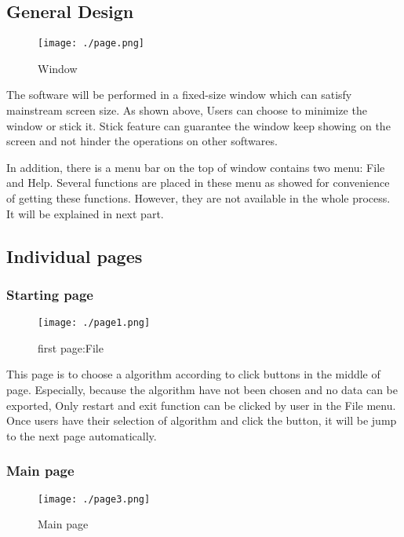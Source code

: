 \documentclass[11pt,oneside,a4paper]{article}
\begin{document}
    \subsection{General Design}
    \begin{figure}[ht]
        \centering
        \texttt{[image: ./page.png]}
        \caption{Window}
        \label{fig:label}
    \end{figure}

    The software will be performed in a fixed-size window which can satisfy mainstream screen size. As shown above, Users can choose to minimize the window or stick it. Stick feature can guarantee the window keep showing on the screen and not hinder the operations on other softwares.

    In addition, there is a menu bar on the top of window contains two menu: File and Help. Several functions are placed in these menu as showed for convenience of getting these functions. However, they are not available in the whole process. It will be explained in next part.

    \subsection{Individual pages}
        \subsubsection{Starting page}
        \begin{figure}[H]
            \centering
            \texttt{[image: ./page1.png]}
            \caption{first page:File}
            \label{fig:label1}
        \end{figure}

        This page is to choose a algorithm according to click buttons in the middle of page. Especially, because the algorithm have not been chosen and no data can be exported, Only restart and exit function can be clicked by user in the File menu. Once users have their selection of algorithm and click the button, it will be jump to the next page automatically.
        \subsubsection{Main page}
        \begin{figure}[H]
            \centering
            \texttt{[image: ./page3.png]}
            \caption{Main page}
            \label{fig:label2}
        \end{figure}
\end{document}
